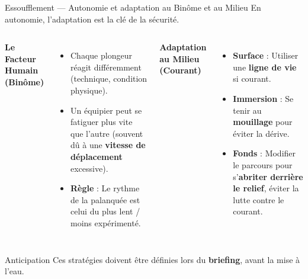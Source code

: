\begin{frame}{Essoufflement — Autonomie et adaptation au Binôme et au Milieu}
    \small
    En autonomie, l'adaptation est la clé de la sécurité.
    \vspace{0.4em}
    
    \begin{columns}[T,totalwidth=\textwidth]
        \textbf{Le Facteur Humain (Binôme)}
        \begin{itemize}
            \item Chaque plongeur réagit différemment (technique, condition physique).
            \item Un équipier peut se fatiguer plus vite que l'autre (souvent dû à une \textbf{\textcolor{ffessmred}{vitesse de déplacement}} excessive).
            \item \textbf{Règle} : Le rythme de la palanquée est celui du plus lent / moins expérimenté.
        \end{itemize}

        \textbf{Adaptation au Milieu (Courant)}
        \begin{itemize}
            \item \textbf{Surface} : Utiliser une \textbf{ligne de vie} si courant.
            \item \textbf{Immersion} : Se tenir au \textbf{mouillage} pour éviter la dérive.
            \item \textbf{Fonds} : Modifier le parcours pour s'\textbf{abriter derrière le relief}, éviter la lutte contre le courant.
        \end{itemize}
    \end{columns}

    \begin{block}{Anticipation}
        Ces stratégies doivent être définies lors du \textbf{briefing}, avant la mise à l'eau.
    \end{block}
\end{frame}